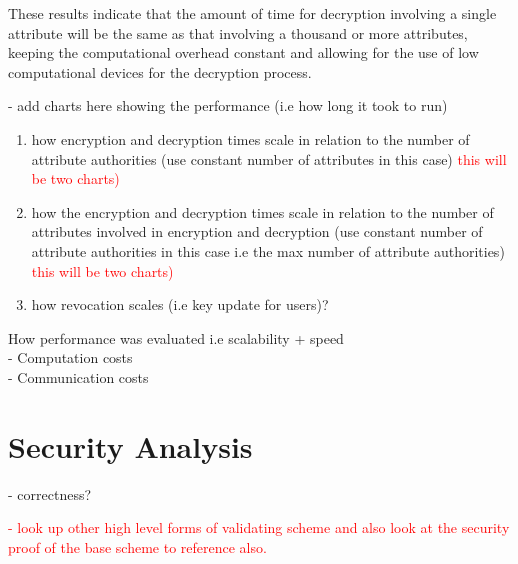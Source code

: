 These results indicate that the amount of time for decryption involving a single attribute will be the same as that involving a thousand or more attributes, keeping the computational overhead constant and allowing for the use of low computational devices for the decryption process.


- add charts here showing the performance (i.e how long it took to run)
\begin{enumerate}
	\item how encryption and decryption times scale in relation to the number of attribute authorities (use constant number of attributes in this case)  \textcolor{red}{this will be two charts)}
	\item how the encryption and decryption times scale in relation to the number of attributes involved in encryption and decryption (use constant number of attribute authorities in this case i.e the max number of attribute authorities)  \textcolor{red}{this will be two charts)}
	\item how revocation scales (i.e key update for users)?
\end{enumerate}

How performance was evaluated i.e scalability + speed
\\- Computation costs
\\- Communication costs

\section{Security Analysis}

- correctness? 

\textcolor{red}{- look up other high level forms of validating scheme and also look at the security proof of the base scheme to reference also.}